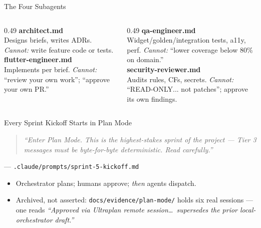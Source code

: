 \documentclass[aspectratio=169,11pt]{beamer}
\begin{document}

\begin{frame}{The Four Subagents}
\begin{columns}[T,onlytextwidth]
  \begin{column}{0.49\textwidth}
    \textbf{\color{moodgreen}architect.md}\\
    {\footnotesize Designs briefs, writes ADRs. \textit{Cannot:} write feature code or tests.}\\[0.5em]
    \textbf{\color{moodgreen}flutter-engineer.md}\\
    {\footnotesize Implements per brief. \textit{Cannot:} ``review your own work''; ``approve your own PR.''}
  \end{column}
  \begin{column}{0.49\textwidth}
    \textbf{\color{moodgreen}qa-engineer.md}\\
    {\footnotesize Widget/golden/integration tests, a11y, perf. \textit{Cannot:} ``lower coverage below 80\% on domain.''}\\[0.5em]
    \textbf{\color{moodgreen}security-reviewer.md}\\
    {\footnotesize Audits rules, CFs, secrets. \textit{Cannot:} ``READ-ONLY... not patches''; approve its own findings.}
  \end{column}
\end{columns}
\vfill
{}
\end{frame}

\begin{frame}{Every Sprint Kickoff Starts in Plan Mode}
  \begin{quote}\itshape\color{moodgreendark}
  ``Enter Plan Mode. This is the highest-stakes sprint of the project --- Tier 3 messages must be byte-for-byte deterministic. Read carefully.''
  \end{quote}
  \hfill{\footnotesize --- \texttt{.claude/prompts/sprint-5-kickoff.md}}
  \vspace{0.6em}
  \begin{itemize}\small
    \item Orchestrator plans; humans approve; \emph{then} agents dispatch.
    \item Archived, not asserted: \texttt{docs/evidence/plan-mode/} holds six real sessions --- one reads \textit{``Approved via Ultraplan remote session\dots\ supersedes the prior local-orchestrator draft.''}
  \end{itemize}
\end{frame}
\end{document}

